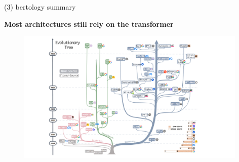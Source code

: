 \begin{frame}{(3) bertology summary}

\vfill

\textbf{Most architectures still rely on the transformer}

	\begin{figure}
		\centering
		\includegraphics[width = 11cm]{figure/51-models.png}\\
	\end{figure}

\vfill

\end{frame}


\endlecture

